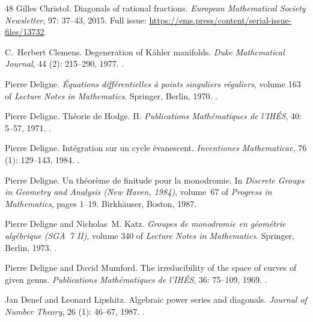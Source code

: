 \documentclass[11pt]{amsart}
\theoremstyle{definition}
\theoremstyle{remark}
\numberwithin{equation}{section}
\begin{document}
\begin{thebibliography}{48}
Gilles Christol.
\newblock Diagonals of rational fractions.
\newblock \emph{European Mathematical Society Newsletter}, 97: 37--43,
  2015.
\newblock Full issue: \url{https://ems.press/content/serial-issue-files/13732}.

C.~Herbert Clemens.
\newblock Degeneration of {K}{\"a}hler manifolds.
\newblock \emph{Duke Mathematical Journal}, 44 (2): 215--290,
  1977.
\newblock {}.

Pierre Deligne.
\newblock \emph{{\'E}quations diff{\'e}rentielles {\`a} points singuliers
  r{\'e}guliers}, volume 163 of \emph{Lecture Notes in Mathematics}.
\newblock Springer, Berlin, 1970.
\newblock {}.

Pierre Deligne.
\newblock Th{\'e}orie de {H}odge. {II}.
\newblock \emph{Publications Math{\'e}matiques de l'IH{\'E}S}, 40:
  5--57, 1971.
\newblock {}.

Pierre Deligne.
\newblock Int{\'e}gration sur un cycle {\'e}vanescent.
\newblock \emph{Inventiones Mathematicae}, 76 (1): 129--143,
  1984.
\newblock {}.

Pierre Deligne.
\newblock Un th{\'e}or{\`e}me de finitude pour la monodromie.
\newblock In \emph{Discrete Groups in Geometry and Analysis (New Haven, 1984)},
  volume~67 of \emph{Progress in Mathematics}, pages 1--19. Birkh{\"a}user,
  Boston, 1987.

Pierre Deligne and Nicholas~M. Katz.
\newblock \emph{Groupes de monodromie en g{\'e}om{\'e}trie alg{\'e}brique
  ({SGA}~7 {II})}, volume 340 of \emph{Lecture Notes in Mathematics}.
\newblock Springer, Berlin, 1973.
\newblock {}.

Pierre Deligne and David Mumford.
\newblock The irreducibility of the space of curves of given genus.
\newblock \emph{Publications Math{\'e}matiques de l'IH{\'E}S}, 36:
  75--109, 1969.
\newblock {}.

Jan Denef and Leonard Lipshitz.
\newblock Algebraic power series and diagonals.
\newblock \emph{Journal of Number Theory}, 26 (1): 46--67,
  1987.
\newblock {}.


\end{thebibliography}
\end{document}
